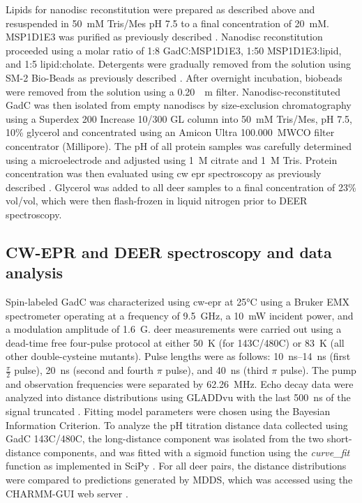 Lipids for nanodisc reconstitution were prepared as described above and resuspended in \SI{50}{mM} Tris/Mes pH 7.5 to a final concentration of \SI{20}{mM}. MSP1D1E3 was purified as previously described \citep*{Jagessar2020}. Nanodisc reconstitution proceeded using a molar ratio of 1:8 GadC:MSP1D1E3, 1:50 MSP1D1E3:lipid, and 1:5 lipid:cholate. Detergents were gradually removed from the solution using SM-2 Bio-Beads as previously described \citep*{Jagessar2020}. After overnight incubation, biobeads were removed from the solution using a \SI{0.20}{\upmu m} filter. Nanodisc-reconstituted GadC was then isolated from empty nanodiscs by size-exclusion chromatography using a Superdex 200 Increase 10/300 GL column into \SI{50}{mM} Tris/Mes, pH 7.5, 10\% glycerol and concentrated using an Amicon Ultra \SI{100,000}{MWCO} filter concentrator (Millipore). The pH of all protein samples was carefully determined using a microelectrode and adjusted using \SI{1}{M} citrate and \SI{1}{M} Tris. Protein concentration was then evaluated using \gls{cw} \gls{epr} spectroscopy as previously described \citep*{Zou2010}. Glycerol was added to all \gls{deer} samples to a final concentration of 23\% vol/vol, which were then flash-frozen in liquid nitrogen prior to DEER spectroscopy.

\subsection{CW-EPR and DEER spectroscopy and data analysis}

Spin-labeled GadC was characterized using \gls{cw}-\gls{epr} at 25°C using a Bruker EMX spectrometer operating at a frequency of \SI{9.5}{GHz}, a \SI{10}{mW} incident power, and a modulation amplitude of \SI{1.6}{G}. \Gls{deer} measurements were carried out using a dead-time free four-pulse protocol \citep*{Pannier2000} at either \SI{50}{K} (for 143C/480C) or \SI{83}{K} (all other double-cysteine mutants). Pulse lengths were as follows: \SIrange{10}{14}{ns} (first $\frac{\pi}{2}$ pulse), \SI{20}{ns} (second and fourth $\pi$ pulse), and \SI{40}{ns} (third $\pi$ pulse). The pump and observation frequencies were separated by \SI{62.26}{MHz}. Echo decay data were analyzed into distance distributions using GLADDvu with the last \SI{500}{ns} of the signal truncated \citep*{Hustedt2018}. Fitting model parameters were chosen using the Bayesian Information Criterion. To analyze the pH titration distance data collected using GadC 143C/480C, the long-distance component was isolated from the two short-distance components, and was fitted with a sigmoid function using the \emph{curve\_fit} function as implemented in SciPy \citep*{Virtanen2020}. For all \gls{deer} pairs, the distance distributions were compared to predictions generated by MDDS, which was accessed using the CHARMM-GUI web server \citep*{Jo2014}.


